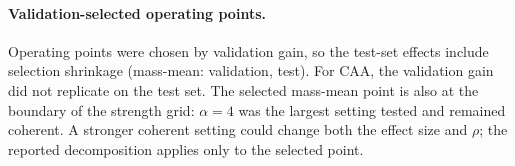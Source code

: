 \paragraph{Validation-selected operating points.}
Operating points were chosen by validation gain, so the test-set effects include selection shrinkage (mass-mean: \MmValDelta{} validation, \MmTestDelta{} test). For CAA, the validation gain did not replicate on the test set. The selected mass-mean point is also at the boundary of the strength grid: $\alpha{=}4$ was the largest setting tested and remained coherent. A stronger coherent setting could change both the effect size and $\rho$; the reported decomposition applies only to the selected point.
